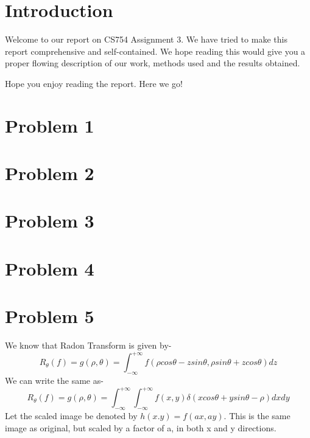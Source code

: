 \documentclass[a4paper,11pt]{article}
\numberwithin{definition}{section}
\numberwithin{mytheorem}{subsection}
\begin{document}

\date{Spring 2022}
\maketitle

\justifying
\tableofcontents

\newpage
\justifying
\section*{Introduction}

Welcome  to our report on CS754 Assignment 3. We have tried to make this report comprehensive and self-contained. We hope reading this would give you a proper flowing description of our work, methods used and the results obtained.

Hope you enjoy reading the report. Here we go!


\section{Problem 1}


\section{Problem 2}


\section{Problem 3}


\section{Problem 4}


\section{Problem 5}

We know that Radon Transform is given by-
$$R_\theta(f) =g(\rho, \theta)= \int_{-\infty}^{+\infty}f(\rho cos\theta - zsin\theta,\rho sin \theta + z cos\theta)dz $$
We can write the same as-
$$R_\theta(f) =g(\rho, \theta)= \int_{-\infty}^{+\infty}\int_{-\infty}^{+\infty}f(x,y)\delta(xcos\theta+ysin\theta -\rho)dxdy $$
Let the scaled image be denoted by $h(x.y) = f(ax, ay)$. This is the same image as original, but scaled by a factor of a, in both x and y directions.
\end{document}
